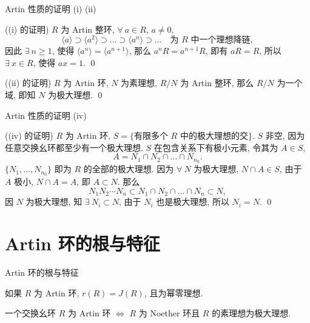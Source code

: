 
\begin{frame}{Artin 性质的证明 (i) (ii)}

\startproof[bg=yellow, fg=red]((i) 的证明)
$R$ 为 Artin 整环, $\forall\ a \in R$, $a \neq 0$,
\[
\langle a \rangle \supset \langle a^2 \rangle \supset \dots \supset \langle a^n \rangle \supset \dots
\quad \text{为 } R \text{ 中一个理想降链},
\]
因此 $\exists\ n \geqslant 1$, 使得 $\langle a^n \rangle = \langle a^{n+1} \rangle$,
那么 $a^n R = a^{n+1} R$, 即有 $a R = R$,
所以 $\exists\ x \in R$, 使得 $ax = 1$.
\qed

\pause

\startproof[bg=yellow, fg=red]((ii) 的证明)
$R$ 为 Artin 环, $N$ 为素理想, $R/N$ 为 Artin 整环,
那么 $R/N$ 为一个域, 即知 $N$ 为极大理想.
\qed

\end{frame}


\begin{frame}{Artin 性质的证明 (iv)}

\startproof[bg=yellow, fg=red]((iv) 的证明)
$R$ 为 Artin 环, $S = \{ \text{有限多个 } R \text{ 中的极大理想的交} \}$.
$S$ 非空, 因为任意交换幺环都至少有一个极大理想.
$S$ 在包含关系下有极小元素, 令其为 $A \in S$,
\[
A = N_1 \cap N_2 \cap \dots \cap N_{n_0} .
\]
$\{ N_1, \dots, N_{n_0} \}$ 即为 $R$ 的全部的极大理想.
因为 $\forall\ N$ 为极大理想, $N \cap A \in S$, 由于 $A$ 极小, $N \cap A = A$,
即 $A \subset N$.
那么
\[
N_1 N_2 \cdots N_n \subset N_1 \cap N_2 \cap \dots \cap N_n \subset N ,
\]
因 $N$ 为极大理想, 知 $\exists\ N_i \subset N$, 由于 $N_i$ 也是极大理想,
所以 $N_i = N$.
\qed

\end{frame}


\section[根与特征]{Artin 环的根与特征}


\begin{frame}{Artin 环的根与特征}

\begin{lem}
如果 $R$ 为 Artin 环, $r(R) = J(R)$, 且为幂零理想.
\end{lem}

\pause

\begin{thm}
一个交换幺环 $R$ 为 Artin 环
$\iff$ $R$ 为 Noether 环且 $R$ 的素理想为极大理想.
\end{thm}

\end{frame}



